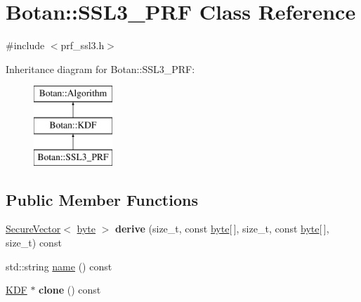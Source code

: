 \hypertarget{classBotan_1_1SSL3__PRF}{\section{Botan\-:\-:S\-S\-L3\-\_\-\-P\-R\-F Class Reference}
\label{classBotan_1_1SSL3__PRF}
}


{\ttfamily \#include $<$prf\-\_\-ssl3.\-h$>$}

Inheritance diagram for Botan\-:\-:S\-S\-L3\-\_\-\-P\-R\-F\-:\begin{figure}[H]
\begin{center}
\leavevmode
\includegraphics[height=3.000000cm]{classBotan_1_1SSL3__PRF}
\end{center}
\end{figure}
\subsection*{Public Member Functions}
\begin{DoxyCompactItemize}
\item 
\hypertarget{classBotan_1_1SSL3__PRF_a8bf197c5c6e6bb7cf60943928e4bc125}{\hyperlink{classBotan_1_1SecureVector}{Secure\-Vector}$<$ \hyperlink{namespaceBotan_a7d793989d801281df48c6b19616b8b84}{byte} $>$ {\bfseries derive} (size\-\_\-t, const \hyperlink{namespaceBotan_a7d793989d801281df48c6b19616b8b84}{byte}\mbox{[}$\,$\mbox{]}, size\-\_\-t, const \hyperlink{namespaceBotan_a7d793989d801281df48c6b19616b8b84}{byte}\mbox{[}$\,$\mbox{]}, size\-\_\-t) const }\label{classBotan_1_1SSL3__PRF_a8bf197c5c6e6bb7cf60943928e4bc125}

\item 
std\-::string \hyperlink{classBotan_1_1SSL3__PRF_a99436e3d88ebb38790434c1292f5b885}{name} () const 
\item 
\hypertarget{classBotan_1_1SSL3__PRF_a3d630c966cf155d51de94e3f4189ee9f}{\hyperlink{classBotan_1_1KDF}{K\-D\-F} $\ast$ {\bfseries clone} () const }\label{classBotan_1_1SSL3__PRF_a3d630c966cf155d51de94e3f4189ee9f}

\end{DoxyCompactItemize}


